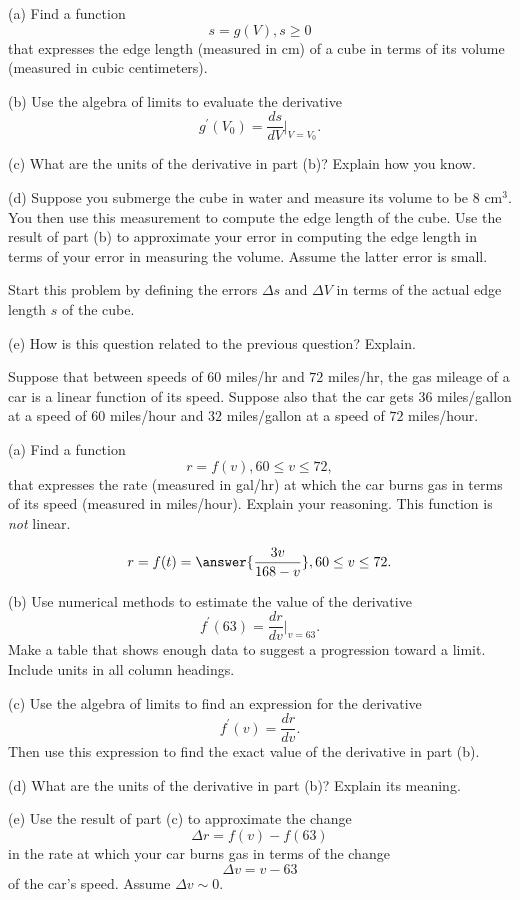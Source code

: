 \documentclass{ximera}
\begin{document}
\begin{question}  \label{Qd9fsd0g}
(a) Find a function 
\[
   s = g(V) , s\geq 0
\]
that expresses the edge length (measured in cm) of a cube in terms of its volume (measured in cubic centimeters).

(b) Use the algebra of limits to evaluate the derivative
\[
       g^\prime(V_0) = \frac{ds}{dV}\Big|_{V=V_0}.
\]

(c) What are the units of the derivative in part (b)? Explain how you know.

(d) Suppose you submerge the cube in water and measure its volume to be $8\text{ cm}^3$. You then use this measurement to compute the edge length of the cube. Use the result of part (b) to approximate your error in computing the edge length in terms of your error in measuring the volume. Assume the latter error is small. 

Start this problem by defining the errors $\Delta s$ and $\Delta V$ in terms of the actual edge length $s$ of the cube.

(e) How is this question related to the previous question? Explain.

\end{question}




\begin{question}  \label{Q354rertb}
Suppose that between speeds of $60$ miles/hr and $72$ miles/hr, the gas mileage of a car is a linear function of its speed. Suppose also that the car gets $36$ miles/gallon at a speed of $60$ miles/hour and $32$ miles/gallon at a speed of $72$ miles/hour.

(a) Find a function
\[
    r = f(v) , 60\leq v \leq 72 ,
\]
that expresses the rate (measured in gal/hr) at which the car burns gas in terms of its speed (measured in miles/hour). Explain your reasoning. This function is \emph{not} linear.
\begin{hint}
\[
        r = f(t) = \answer{\frac{3v}{168-v}} , 60\leq v \leq 72 .
\]
\end{hint}

(b) Use numerical methods to estimate the value of the derivative
\[
    f^\prime(63) = \frac{dr}{dv}\Big|_{v=63} .
\]
Make a table that shows enough data to suggest a progression toward a limit. Include units in all column headings.

(c) Use the algebra of limits to find an expression for the derivative
\[
   f^\prime(v) = \frac{dr}{dv} .
\]
Then use this expression to find the exact value of the derivative in part (b). 

(d) What are the units of the derivative in part (b)? Explain its meaning.

(e) Use the result of part (c) to approximate the change 
\[
       \Delta r = f(v) - f(63)
\]
in the rate at which your car burns gas in terms of the change
\[
     \Delta v = v - 63
\]
of the car's speed. Assume $\Delta v \sim 0$.

\end{question}
\end{document}
